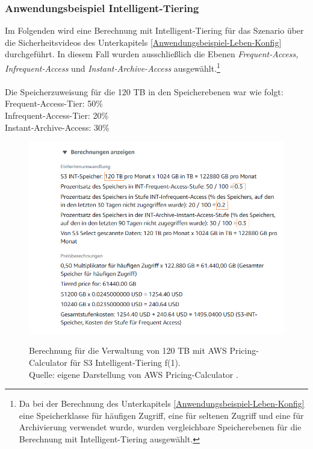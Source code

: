 \subsubsection*{Anwendungsbeispiel Intelligent-Tiering} 
Im Folgenden wird eine Berechnung mit Intelligent-Tiering für das Szenario über die Sicherheitsvideos des Unterkapitels \ref{Anwendungsbeispiel-Leben-Konfig} durchgeführt. In diesem Fall wurden ausschließlich die Ebenen \textit{Frequent-Access, Infrequent-Access} und \textit{Instant-Archive-Access} ausgewählt.\footnote{Da bei der Berechnung des Unterkapitels \ref{Anwendungsbeispiel-Leben-Konfig} eine Speicherklasse für häufigen Zugriff, eine für seltenen Zugriff und eine für Archivierung verwendet wurde, wurden vergleichbare Speicherebenen für die Berechnung mit Intelligent-Tiering ausgewählt.} %
\\\\
Die Speicherzuweisung für die 120 TB in den Speicherebenen war wie folgt:\\
Frequent-Access-Tier: 50\% \\
Infrequent-Access-Tier: 20\%\\
Instant-Archive-Access: 30\%
\\
\begin{figure}[h!]
  \centering
  \includegraphics[scale=0.6]{sources/S3_INT_1}
  \caption[Berechnung für die Verwaltung von 120 TB mit AWS Pricing-Calculator für S3 Intelligent-Tiering (1)]{}
  \label{fig:INT_S3_1} Berechnung für die Verwaltung von 120 TB mit AWS Pricing-Calculator für S3 Intelligent-Tiering f(1).\\
  Quelle: eigene Darstellung von AWS Pricing-Calculator \cite{AMZ17-S3}.
\end{figure}
